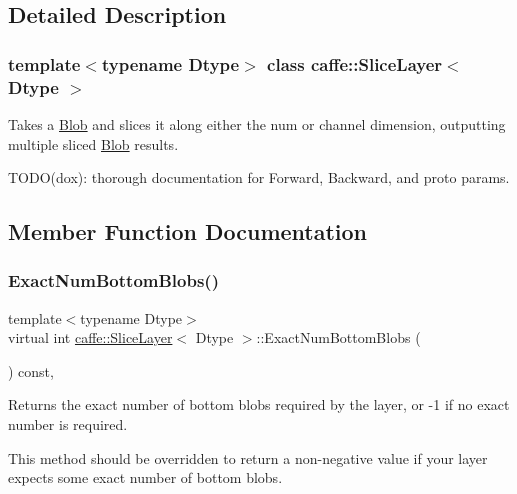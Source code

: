 \subsection{Detailed Description}
\subsubsection*{template$<$typename Dtype$>$\newline
class caffe\+::\+Slice\+Layer$<$ Dtype $>$}

Takes a \mbox{\hyperlink{classcaffe_1_1_blob}{Blob}} and slices it along either the num or channel dimension, outputting multiple sliced \mbox{\hyperlink{classcaffe_1_1_blob}{Blob}} results. 

T\+O\+D\+O(dox)\+: thorough documentation for Forward, Backward, and proto params. 

\subsection{Member Function Documentation}
\mbox{\label{classcaffe_1_1_slice_layer_abfc6e86b0b22c156ddc350168cd7757b}} 
\subsubsection{\texorpdfstring{Exact\+Num\+Bottom\+Blobs()}{ExactNumBottomBlobs()}\hspace{0.1cm}{\footnotesize\ttfamily [1/2]}}
{\footnotesize\ttfamily template$<$typename Dtype$>$ \\
virtual int \mbox{\hyperlink{classcaffe_1_1_slice_layer}{caffe\+::\+Slice\+Layer}}$<$ Dtype $>$\+::Exact\+Num\+Bottom\+Blobs (\begin{DoxyParamCaption}{ }\end{DoxyParamCaption}) const\hspace{0.3cm}{\ttfamily [inline]}, {\ttfamily [virtual]}}



Returns the exact number of bottom blobs required by the layer, or -\/1 if no exact number is required. 

This method should be overridden to return a non-\/negative value if your layer expects some exact number of bottom blobs. 

